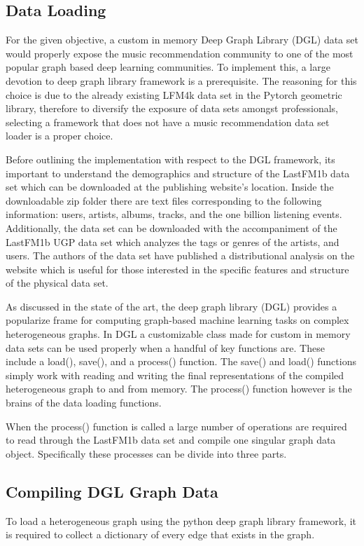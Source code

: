 \subsection{Data Loading}

For the given objective, a custom in memory Deep Graph Library (DGL) data set would properly expose the music recommendation community to one of the most popular graph based deep learning communities. To implement this, a large devotion to deep graph library framework is a prerequisite. The reasoning for this choice is due to the already existing LFM4k data set in the Pytorch geometric library, therefore to diversify the exposure of data sets amongst professionals, selecting a framework that does not have a music recommendation data set loader is a proper choice.

Before outlining the implementation with respect to the DGL framework, its important to understand the demographics and structure of the LastFM1b data set which can be downloaded at the publishing website's location. Inside the downloadable zip folder there are text files corresponding to the following information: users, artists, albums, tracks, and the one billion listening events. Additionally, the data set can be downloaded with the accompaniment of the LastFM1b UGP data set which analyzes the tags or genres of the artists, and users. The authors of the data set have published a distributional analysis on the website which is useful for those interested in the specific features and structure of the physical data set. \cite{Schedl2016}

As discussed in the state of the art, the deep graph library (DGL) provides a popularize frame for computing graph-based machine learning tasks on complex heterogeneous graphs. In DGL a customizable class made for custom in memory data sets can be used properly when a handful of key functions are. These include a load(), save(), and a process() function. The save() and load() functions simply work with reading and writing the final representations of the compiled heterogeneous graph to and from memory. The process() function however is the brains of the data loading functions.

When the process() function is called a large number of operations are required to read through the LastFM1b data set and compile one singular graph data object. Specifically these processes can be divide into three parts. \subsection{Compiling DGL Graph Data} To load a heterogeneous graph using the python deep graph library framework, it is required to collect a dictionary of every edge that exists in the graph. 



